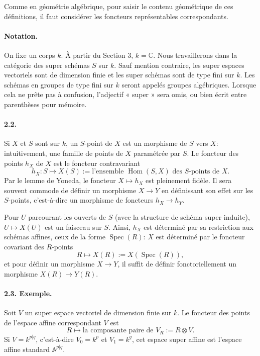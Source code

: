 \documentclass[11pt]{article}
\newcommand{\C}{\mathbb C}
\newcommand{\Spec}{\operatorname{Spec}}
\newcommand{\Hom}{\operatorname{Hom}}
\begin{document}
Comme en géométrie algébrique, pour saisir le contenu géométrique de ces définitions, il faut considérer les foncteurs représentables correspondants.

\paragraph{Notation.}
On fixe un corps $k$. À partir du Section 3, $k=\C$. Nous travaillerons dans la catégorie des super schémas $S$ sur $k$. Sauf mention contraire, les super espaces vectoriels sont de dimension finie et les super schémas sont de type fini sur $k$. Les schémas en groupes de type fini sur $k$ seront appelés groupes algébriques. Lorsque cela ne prête pas à confusion, l'adjectif « super » sera omis, ou bien écrit entre parenthèses pour mémoire.

\paragraph{2.2.}
Si $X$ et $S$ sont sur $k$, un $S$-point de $X$ est un morphisme de $S$ vers $X$: intuitivement, une famille de points de $X$ paramétrée par $S$. Le foncteur des points $h_X$ de $X$ est le foncteur contravariant
\[
h_X:S\longmapsto X(S):=\text{l'ensemble }\Hom(S,X)\text{ des }S\text{-points de }X.
\]
Par le lemme de Yoneda, le foncteur $X\mapsto h_X$ est pleinement fidèle. Il sera souvent commode de définir un morphisme $X\to Y$ en définissant son effet sur les $S$-points, c'est-à-dire un morphisme de foncteurs $h_X\to h_Y$.

Pour $U$ parcourant les ouverts de $S$ (avec la structure de schéma super induite), $U\mapsto X(U)$ est un faisceau sur $S$. Ainsi, $h_X$ est déterminé par sa restriction aux schémas affines, ceux de la forme $\Spec(R)$: $X$ est déterminé par le foncteur covariant des $R$-points
\[
R\longmapsto X(R):=X(\Spec(R)),
\]
et pour définir un morphisme $X\to Y$, il suffit de définir fonctoriellement un morphisme $X(R)\to Y(R)$.

\paragraph{2.3. Exemple.}
Soit $V$ un super espace vectoriel de dimension finie sur $k$. Le foncteur des points de l'espace affine correspondant $V$ est
\[
R\longmapsto \text{la composante paire de }V_R:=R\otimes V.
\]
Si $V=k^{p|q}$, c'est-à-dire $V_0=k^p$ et $V_1=k^q$, cet espace super affine est l'espace affine standard $\mathbb A^{p|q}$.
\end{document}

